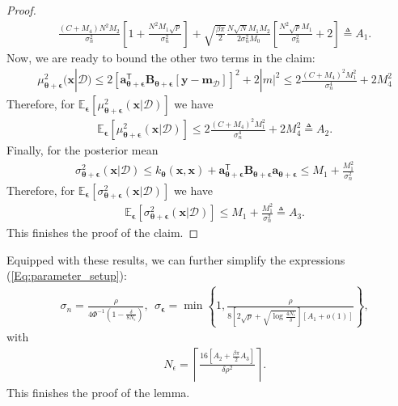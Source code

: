 \documentclass[jair,twoside,11pt,theapa]{article}
\theoremstyle{definition}
\begin{document}
\begin{proof}
\begin{align*}
    &\frac{(C+M_4)N^2M_2}{\sigma^2_n}\left[1 + \frac{N^2M_1\sqrt{p}}{\sigma^2_n}\right] + \nonumber
    \sqrt{\frac{\beta\pi}{2}}\frac{N\sqrt{N}M_1M_2}{2\sigma^2_nM_0}\left[\frac{N^2\sqrt{p}M_1}{\sigma^2_n}+2\right] \triangleq A_1.
\end{align*}
Now, we are ready to bound the other two terms in the claim:
\begin{align*}
    &\mu^2_{\bm{\theta}+\bm{\epsilon}}(\bm{x}|\mathcal{D}) \le 2\left[\bm{a}^{\mathsf{T}}_{\bm{\theta}+\bm{\epsilon}}\bm{B}_{\bm{\theta}+\bm{\epsilon}}[\bm{y} - \bm{m}_{\mathcal{D}}]\right]^2 + 2|m|^2 \le \nonumber
    2\frac{(C + M_4)^2M^2_1}{\sigma^4_n} + 2M^2_4
\end{align*}
Therefore, for $\mathbb{E}_{\bm{\epsilon}}\left[\mu^2_{\bm{\theta}+\bm{\epsilon}}(\bm{x}|\mathcal{D})\right]$ we have
\begin{align*}
    &\mathbb{E}_{\bm{\epsilon}}\left[\mu^2_{\bm{\theta}+\bm{\epsilon}}(\bm{x}|\mathcal{D})\right] \le 2\frac{(C + M_4)^2M^2_1}{\sigma^4_n} + 2M^2_4 \triangleq A_2.
\end{align*}
Finally, for the posterior mean
\begin{align*}
    &\sigma^2_{\bm{\theta}+\bm{\epsilon}}(\bm{x}|\mathcal{D}) \le k_{\bm{\theta}}(\bm{x},\bm{x}) + \bm{a}^{\mathsf{T}}_{\bm{\theta}+\bm{\epsilon}}\bm{B}_{\bm{\theta}+\bm{\epsilon}}\bm{a}_{\bm{\theta}+\bm{\epsilon}} \le \nonumber
    M_1 + \frac{M^2_1}{\sigma^2_n}
\end{align*}
Therefore, for $\mathbb{E}_{\bm{\epsilon}}\left[\sigma^2_{\bm{\theta}+\bm{\epsilon}}(\bm{x}|\mathcal{D})\right]$ we have
\begin{align*}
    &\mathbb{E}_{\bm{\epsilon}}\left[\sigma^2_{\bm{\theta}+\bm{\epsilon}}(\bm{x}|\mathcal{D})\right] \le M_1 + \frac{M^2_1}{\sigma^2_n} \triangleq A_3.
\end{align*}
This finishes the proof of the claim.
\end{proof}

\noindent Equipped with these results, we can further simplify the expressions (\ref{Eq:parameter_setup}):
\begin{align*}
    &\sigma_n = \frac{\rho}{4\Phi^{-1}\left(1 - \frac{\delta}{8N_{\epsilon}}\right)},\ \ \nonumber
    \sigma_{\bm{\epsilon}} = \min\left\{1, \frac{\rho}{8\left[2\sqrt{p} + \sqrt{\log\frac{4N_{\epsilon}}{\delta}}\right]\left[A_1 + o(1)\right]}\right\},
\end{align*}
with
\begin{align*}
    &N_{\epsilon} = \left\lceil\frac{16\left[A_2 + \frac{\beta\pi}{2}A_3\right]}{\delta\rho^2}\right\rceil.
\end{align*}
This finishes the proof of the lemma. \\
\end{document}
